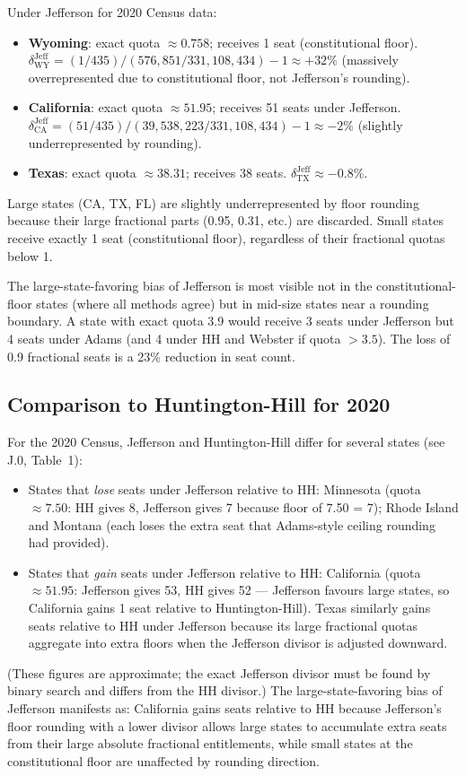 Under Jefferson for 2020 Census data:
\begin{itemize}
  \item \textbf{Wyoming}: exact quota $\approx 0.758$; receives 1 seat
    (constitutional floor).
    $\delta_{\text{WY}}^{\text{Jeff}} = (1/435) / (576{,}851/331{,}108{,}434) - 1
    \approx +32\%$ (massively overrepresented due to constitutional floor,
    not Jefferson's rounding).
  \item \textbf{California}: exact quota $\approx 51.95$; receives 51 seats
    under Jefferson.
    $\delta_{\text{CA}}^{\text{Jeff}} = (51/435) / (39{,}538{,}223/331{,}108{,}434) - 1
    \approx -2\%$ (slightly underrepresented by rounding).
  \item \textbf{Texas}: exact quota $\approx 38.31$; receives 38 seats.
    $\delta_{\text{TX}}^{\text{Jeff}} \approx -0.8\%$.
\end{itemize}
Large states (CA, TX, FL) are slightly underrepresented by floor rounding
because their large fractional parts (0.95, 0.31, etc.) are discarded.
Small states receive exactly 1 seat (constitutional floor),
regardless of their fractional quotas below 1.

The large-state-favoring bias of Jefferson is most visible not in the
constitutional-floor states (where all methods agree) but in
mid-size states near a rounding boundary.
A state with exact quota 3.9 would receive 3 seats under Jefferson
but 4 seats under Adams (and 4 under HH and Webster if quota $> 3.5$).
The loss of 0.9 fractional seats is a 23\% reduction in seat count.

\subsection{Comparison to Huntington-Hill for 2020}

For the 2020 Census, Jefferson and Huntington-Hill differ for
several states (see J.0, Table~1):
\begin{itemize}
  \item States that \emph{lose} seats under Jefferson relative to HH:
    Minnesota (quota $\approx 7.50$: HH gives 8, Jefferson gives 7
    because floor of 7.50 = 7);
    Rhode Island and Montana (each loses the extra seat that Adams-style
    ceiling rounding had provided).
  \item States that \emph{gain} seats under Jefferson relative to HH:
    California (quota $\approx 51.95$: Jefferson gives 53, HH gives 52
    --- Jefferson favours large states, so California gains 1 seat
    relative to Huntington-Hill).
    Texas similarly gains seats relative to HH under Jefferson
    because its large fractional quotas aggregate into extra floors
    when the Jefferson divisor is adjusted downward.
\end{itemize}
(These figures are approximate; the exact Jefferson divisor must be
found by binary search and differs from the HH divisor.)
The large-state-favoring bias of Jefferson manifests as:
California gains seats relative to HH because Jefferson's floor rounding
with a lower divisor allows large states to accumulate extra seats from
their large absolute fractional entitlements, while small states at the
constitutional floor are unaffected by rounding direction.
